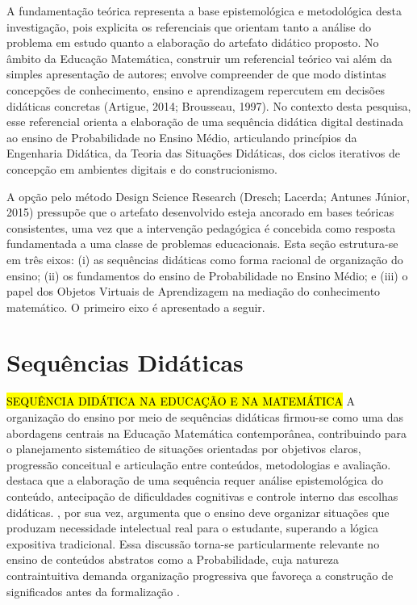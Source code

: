 {\color{blue} A fundamentação teórica representa a base epistemológica e metodológica desta investigação, pois explicita os referenciais que orientam tanto a análise do problema em estudo quanto a elaboração do artefato didático proposto. No âmbito da Educação Matemática, construir um referencial teórico vai além da simples apresentação de autores; envolve compreender de que modo distintas concepções de conhecimento, ensino e aprendizagem repercutem em decisões didáticas concretas (Artigue, 2014; Brousseau, 1997). No contexto desta pesquisa, esse referencial orienta a elaboração de uma sequência didática digital destinada ao ensino de Probabilidade no Ensino Médio, articulando princípios da Engenharia Didática, da Teoria das Situações Didáticas, dos ciclos iterativos de concepção em ambientes digitais e do construcionismo.

A opção pelo método Design Science Research (Dresch; Lacerda; Antunes Júnior, 2015) pressupõe que o artefato desenvolvido esteja ancorado em bases teóricas consistentes, uma vez que a intervenção pedagógica é concebida como resposta fundamentada a uma classe de problemas educacionais. Esta seção estrutura-se em três eixos: (i) as sequências didáticas como forma racional de organização do ensino; (ii) os fundamentos do ensino de Probabilidade no Ensino Médio; e (iii) o papel dos Objetos Virtuais de Aprendizagem na mediação do conhecimento matemático. O primeiro eixo é apresentado a seguir.

\section{Sequências Didáticas}

\hl{SEQUÊNCIA DIDÁTICA NA EDUCAÇÃO E NA MATEMÁTICA} A organização do ensino por meio de sequências didáticas firmou-se como uma das abordagens centrais na Educação Matemática contemporânea, contribuindo para o planejamento sistemático de situações orientadas por objetivos claros, progressão conceitual e articulação entre conteúdos, metodologias e avaliação.  destaca que a elaboração de uma sequência requer análise epistemológica do conteúdo, antecipação de dificuldades cognitivas e controle interno das escolhas didáticas. , por sua vez, argumenta que o ensino deve organizar situações que produzam necessidade intelectual real para o estudante, superando a lógica expositiva tradicional. Essa discussão torna-se particularmente relevante no ensino de conteúdos abstratos como a Probabilidade, cuja natureza contraintuitiva demanda organização progressiva que favoreça a construção de significados antes da formalização \cite[p.~9, 16, 23]{batanero2016}.

}
